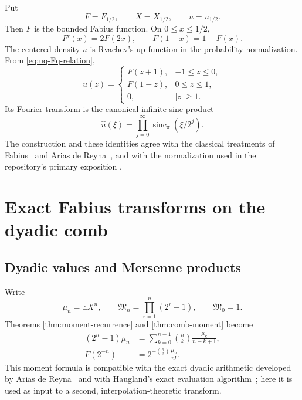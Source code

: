 \documentclass[11pt,a4paper,oneside]{article}
\theoremstyle{definition}
\theoremstyle{remark}
\newcommand{\E}{\mathbb E}
\newcommand{\sincpi}{\operatorname{sinc}_{\pi}}
\begin{document}
Put
\[
 F=F_{1/2},\qquad X=X_{1/2},\qquad u=u_{1/2}.
\]
Then $F$ is the bounded Fabius function.  On $0\le x\le1/2$,
\[
 F'(x)=2F(2x),
 \qquad
 F(1-x)=1-F(x).
\]
The centered density $u$ is Rvachev's up-function in the probability
normalization.  From \eqref{eq:uq-Fq-relation},
\begin{equation}
 u(z)=
 \begin{cases}
 F(z+1),&-1\le z\le0,\\
 F(1-z),&0\le z\le1,\\
 0,&|z|\ge1.
 \end{cases}
 \label{eq:up-Fabius-piecewise}
\end{equation}
Its Fourier transform is the canonical infinite sinc product
\begin{equation}
 \widehat u(\xi)=\prod_{j=0}^\infty\sincpi(\xi/2^j).
 \label{eq:up-fourier-classical}
\end{equation}
The construction and these identities agree with the classical treatments of
Fabius~\cite{Fabius1966} and Arias de Reyna~\cite{Arias2017Definition}, and
with the normalization used in the repository's primary exposition
\cite{ProveItFabius}.

\section{Exact Fabius transforms on the dyadic comb}
\label{sec:fabius-transform}

\subsection{Dyadic values and Mersenne products}

Write
\begin{equation}
 \mu_n=\E X^n,
 \qquad
 \mathfrak M_n=\prod_{r=1}^n(2^r-1),
 \qquad \mathfrak M_0=1.
 \label{eq:mersenne-definition}
\end{equation}
Theorems \ref{thm:moment-recurrence} and \ref{thm:comb-moment} become
\begin{align}
 (2^n-1)\mu_n
 &=\sum_{k=0}^{n-1}\binom nk\frac{\mu_k}{n-k+1},
 \label{eq:fabius-moment-recurrence}\\
 F(2^{-n})
 &=2^{-\binom n2}\frac{\mu_n}{n!}.
 \label{eq:fabius-value-moment}
\end{align}
This moment formula is compatible with the exact dyadic arithmetic developed
by Arias de Reyna~\cite{Arias2017Arithmetic} and with Haugland's exact
evaluation algorithm~\cite{Haugland2016}; here it is used as input to a
second, interpolation-theoretic transform.
\end{document}
